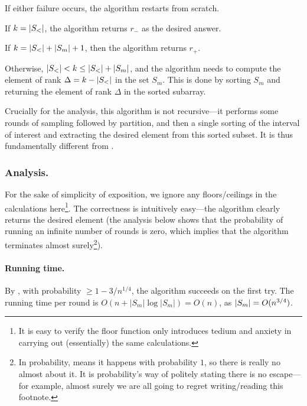 \medskip%
If either failure occurs, the algorithm restarts from scratch.
\begin{compactitem}
    \smallskip%
    \item If $k = \left| {S_<} \right|$, the algorithm returns $r_-$ as the
    desired answer.

    \smallskip%
    \item If $k = \left| {S_<} \right| + \left| {S_m} \right| + 1$, then the algorithm
    returns $r_+$.

    \smallskip%
    \item Otherwise, $\left| {S_<} \right| < k \leq \left| {S_<} \right| + \left| {S_m} \right|$,
    and the algorithm needs to compute the element of rank
    $\Delta = k - \left| {S_<} \right|$ in the set $S_m$. This is done by sorting
    $S_m$ and returning the element of rank $\Delta$ in the sorted
    subarray.
\end{compactitem}

\begin{remark}
    Crucially for the analysis, this algorithm is not recursive---it
    performs some rounds of sampling followed by partition, and then a
    single sorting of the interval of interest and extracting the desired
    element from this sorted subset. It is thus fundamentally different
    from .
\end{remark}

\subsubsection{Analysis.}

For the sake of simplicity of exposition, we ignore any floors/ceilings
in the calculations here\footnote{It is easy to verify the floor function
   only introduces tedium and anxiety in carrying out (essentially) the
   same calculations.}.  The correctness is intuitively easy---the
algorithm clearly returns the desired element (the analysis below shows
that the probability of running an infinite number of rounds is zero,
which implies that the algorithm terminates almost surely\footnote{In
   probability,  means it happens with probability
   $1$, so there is really no almost about it. It is probability's way of
   politely stating there is no escape---for example, almost surely we are
   all going to regret writing/reading this footnote.}).


\paragraph*{Running time.}
By , with probability $\geq 1-3/n^{1 /4}$, the
algorithm succeeds on the first try.  The running time per round is
$O(n + |S_m| \log |S_m|) = O(n)$, as $\left| {S_m} \right| = O(n^{3/4})$.




